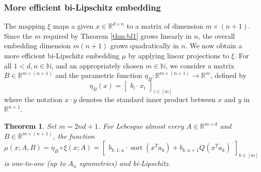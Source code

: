 \documentclass{amsart}
\theoremstyle{plain}
\newtheorem{theorem}{Theorem}
\theoremstyle{definition}
\theoremstyle{remark}
\DeclareMathOperator{\sort}{sort}
\newcommand{\RR}{\mathbb{R}}
\newcommand{\NN}{\mathbb{N}}
\begin{document}
\subsubsection{More efficient bi-Lipschitz embedding} \label{sssec:bl2}
The mapping $\xi$ maps a given $x\in \RR^{d\times n}$ to a matrix of dimension $m\times (n+1) $. Since the $m $ required by Theorem \ref{thm:bl1} grows linearly in $n$, the overall embedding dimension $m(n+1) $ grows quadratically in $n$. We now obtain a more efficient bi-Lipschitz embedding $\mu$ by applying linear projections to $\xi$.  For all $1 < d, n \in \NN$, and an appropriately chosen $m \in \NN$, we consider a matrix $B \in \RR^{m \times (n+1)}$ and the parametric function $\eta_B: \RR^{m \times (n+1)} \to \RR^{m}$, defined by
\begin{equation}
    \eta_B(x) = \begin{bmatrix} b_i \cdot x_i \end{bmatrix}_{i \in [m]}
\end{equation}
where the notation $x\cdot y$ denotes the standard inner product between $x$ and $y$ in $\RR^{n+1}$.
\begin{theorem}\label{thm:multi}
Set $m=2nd+1$.
For Lebesgue almost every $A \in \RR^{m \times d}$ and $B \in \RR^{m \times (n+1)}$, the function 
\begin{equation}
    \mu(x; A, B)=  \eta_B \circ \xi(x ; A) = \begin{bmatrix} b_{k, 1:n} \cdot \sort{\left(x^T a_k \right)} + b_{k, n+1}Q\left(x^T a_k \right)  \end{bmatrix}_{k \in [m]} 
\end{equation}
is one-to-one (up to $A_n$ symmetries) and bi-Lipschitz.
\end{theorem}
\end{document}
